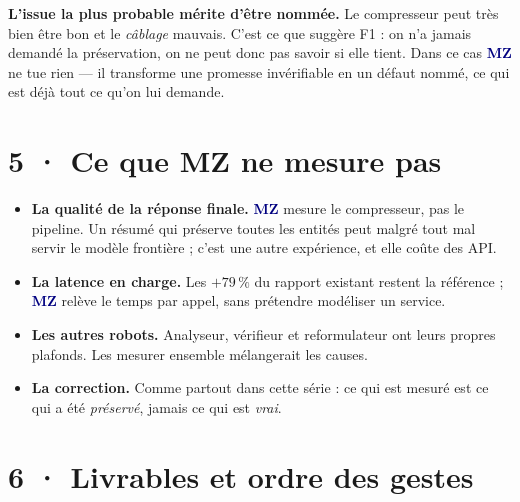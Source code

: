 \documentclass[10pt]{article}
\newcommand{\mm}[1]{\textbf{\textcolor{navy}{#1}}}
\begin{document}
\begin{piste}
\small \textbf{L'issue la plus probable mérite d'être nommée.} Le compresseur peut très bien être
bon et le \emph{câblage} mauvais. C'est ce que suggère F1 : on n'a jamais demandé la préservation, on
ne peut donc pas savoir si elle tient. Dans ce cas \mm{MZ} ne tue rien --- il transforme une promesse
invérifiable en un défaut nommé, ce qui est déjà tout ce qu'on lui demande.
\end{piste}

\section{5 · Ce que MZ ne mesure pas}

\begin{itemize}[leftmargin=1.2em,itemsep=2pt,topsep=2pt]
\item \textbf{La qualité de la réponse finale.} \mm{MZ} mesure le compresseur, pas le pipeline. Un
      résumé qui préserve toutes les entités peut malgré tout mal servir le modèle frontière ; c'est
      une autre expérience, et elle coûte des API.
\item \textbf{La latence en charge.} Les $+79\,\%$ du rapport existant restent la référence ;
      \mm{MZ} relève le temps par appel, sans prétendre modéliser un service.
\item \textbf{Les autres robots.} Analyseur, vérifieur et reformulateur ont leurs propres plafonds.
      Les mesurer ensemble mélangerait les causes.
\item \textbf{La correction.} Comme partout dans cette série : ce qui est mesuré est ce qui a été
      \emph{préservé}, jamais ce qui est \emph{vrai}.
\end{itemize}

\section{6 · Livrables et ordre des gestes}
\end{document}
